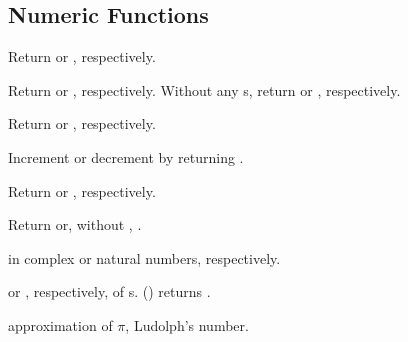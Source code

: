 \subsection[Numeric~Functns]{Numeric Functions} 

\begin{LIST}{1cm}

  {
  Return  or , respectively.
  }

  {
  Return  or , respectively. Without any
  s, return  or , respectively.
  }

  {Return  or
  , respectively.
  }

  {
  Increment or
  decrement  by  returning .
  }

     {
       Return  or , respectively.
     }

  {
  Return  or,
  without , .
  }

  {
     in complex or natural numbers, respectively.
  }

  {
   or , respectively, of s. ()
  returns .
  }

  {
   approximation of $\pi$, Ludolph's number.
  }


\end{LIST}
